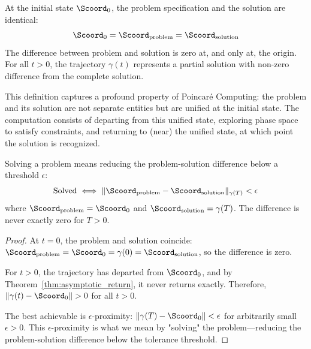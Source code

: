 \begin{definition}
\label{def:problem_solution_identity}
At the initial state $\Scoord_0$, the problem specification and the solution are identical:
\begin{equation}
\Scoord_0 = \Scoord_{\text{problem}} = \Scoord_{\text{solution}}
\label{eq:problem_solution_identity}
\end{equation}
The difference between problem and solution is zero at, and only at, the origin. For all $t > 0$, the trajectory $\gamma(t)$ represents a partial solution with non-zero difference from the complete solution.
\end{definition}

This definition captures a profound property of Poincaré Computing: the problem and its solution are not separate entities but are unified at the initial state. The computation consists of departing from this unified state, exploring phase space to satisfy constraints, and returning to (near) the unified state, at which point the solution is recognized.

\begin{proposition}
\label{prop:solution_approximation}
Solving a problem means reducing the problem-solution difference below a threshold $\epsilon$:
\begin{equation}
\text{Solved} \iff \|\Scoord_{\text{problem}} - \Scoord_{\text{solution}}\|_{\gamma(T)} < \epsilon
\label{eq:solution_approximation}
\end{equation}
where $\Scoord_{\text{problem}} = \Scoord_0$ and $\Scoord_{\text{solution}} = \gamma(T)$. The difference is never exactly zero for $T > 0$.
\end{proposition}

\begin{proof}
At $t = 0$, the problem and solution coincide: $\Scoord_{\text{problem}} = \Scoord_0 = \gamma(0) = \Scoord_{\text{solution}}$, so the difference is zero.

For $t > 0$, the trajectory has departed from $\Scoord_0$, and by Theorem~\ref{thm:asymptotic_return}, it never returns exactly. Therefore, $\|\gamma(t) - \Scoord_0\| > 0$ for all $t > 0$.

The best achievable is $\epsilon$-proximity: $\|\gamma(T) - \Scoord_0\| < \epsilon$ for arbitrarily small $\epsilon > 0$. This $\epsilon$-proximity is what we mean by "solving" the problem—reducing the problem-solution difference below the tolerance threshold.
\end{proof}

